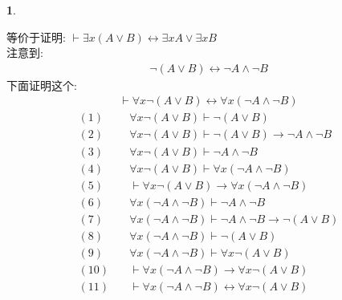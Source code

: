 \documentclass[a4paper, 12pt]{ctexbook} %
\theoremstyle{plain}
\theoremstyle{definition}
\newtheorem{problem}{}
\theoremstyle{remark}
\begin{document}
\begin{problem}
\begin{enumerate}
等价于证明: $\vdash  \exists x \left(A \vee B \right) \leftrightarrow \exists x A \vee \exists x B $\\
注意到: 
\begin{align*}
    \neg \left(A \vee B \right) \leftrightarrow \neg A \wedge \neg B 
\end{align*}
下面证明这个: 
\begin{align*}
\vdash     \forall  x \neg \left(A \vee B \right) \leftrightarrow \forall  x \left(\neg A \wedge \neg B \right)
\end{align*}
\begin{align*}
(1) \quad & \forall  x \neg \left(A \vee B \right) \vdash  \neg \left(A \vee B\right) \tag{去全称}\\
(2) \quad & \forall x \neg \left(A \vee B\right) \vdash \neg \left(A \vee B \right) \to \neg A \wedge \neg B \\
(3) \quad & \forall x \neg \left(A \vee B \right) \vdash  \neg A \wedge \neg B \tag{rmp}\\
(4) \quad & \forall x \neg \left(A \vee B \right) \vdash \forall  x (\neg A \wedge \neg B )\tag{全称推广}\\
(5) \quad & \vdash \forall  x \neg \left(A \vee B \right) \to \forall x \left( \neg A \wedge \neg B \right)\tag{演绎} \\
(6) \quad & \forall x \left(\neg A \wedge \neg B \right) \vdash \neg A \wedge \neg B \tag{去全称}\\
(7) \quad & \forall x \left(\neg A \wedge \neg B \right) \vdash \neg A \wedge \neg B \to \neg \left(A \vee B\right) \\
(8) \quad & \forall x \left(\neg A \wedge \neg B \right) \vdash \neg \left(A \vee B \right) \tag{rmp} \\
(9) \quad & \forall x \left(\neg A \wedge \neg B \right) \vdash \forall x \neg \left(A \vee B \right) \tag{全称推广}\\
(10) \quad & \vdash  \forall x \left(\neg A \wedge \neg B\right) \to  \forall x \neg \left(A \vee  B\right) \tag{演绎}\\
(11) \quad & \vdash \forall x \left(\neg A \wedge \neg B \right) \leftrightarrow \forall x \neg \left(A \vee B \right) \tag{(5)(10)} 
\end{align*}


\end{enumerate}
\end{problem}
\end{document}
